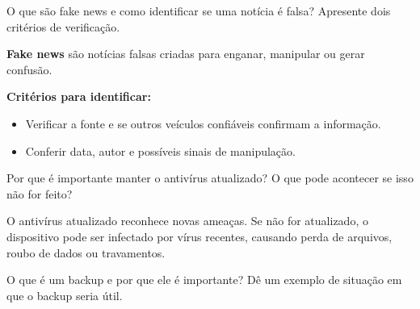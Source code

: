 \documentclass[11pt]{article}
\begin{document}
\begin{tcolorbox}[colback=blue!10,colframe=blue!60!black,
title=\textbf{Questão 5 – Fake News}]
O que são fake news e como identificar se uma notícia é falsa?
Apresente dois critérios de verificação.
\end{tcolorbox}

\begin{tcolorbox}[colback=green!10,colframe=green!60!black,
title=\textbf{Solução 5 — Explicação }]
\textbf{Fake news} são notícias falsas criadas para enganar, manipular ou gerar confusão.

\textbf{Critérios para identificar:}
\begin{itemize}
\item Verificar a fonte e se outros veículos confiáveis confirmam a informação.
\item Conferir data, autor e possíveis sinais de manipulação.
\end{itemize}
\end{tcolorbox}


\begin{tcolorbox}[colback=blue!10,colframe=blue!60!black,
title=\textbf{Questão 6 – Antivírus Atualizado}]
Por que é importante manter o antivírus atualizado?
O que pode acontecer se isso não for feito?
\end{tcolorbox}

\begin{tcolorbox}[colback=green!10,colframe=green!60!black,
title=\textbf{Solução 6 — Explicação }]
O antivírus atualizado reconhece novas ameaças.  
Se não for atualizado, o dispositivo pode ser infectado por vírus recentes,
causando perda de arquivos, roubo de dados ou travamentos.
\end{tcolorbox}


\begin{tcolorbox}[colback=blue!10,colframe=blue!60!black,
title=\textbf{Questão 7 – Backup}]
O que é um backup e por que ele é importante?  
Dê um exemplo de situação em que o backup seria útil.
\end{tcolorbox}
\end{document}
